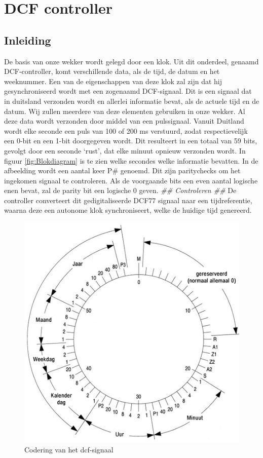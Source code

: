 \chapter{DCF controller}
\section{Inleiding}
De basis van onze wekker wordt gelegd door een klok. Uit dit onderdeel, genaamd DCF-controller,  komt verschillende data, als de tijd, de datum en het weeknummer. Een van de eigenschappen van deze klok zal zijn dat hij gesynchroniseerd wordt met een zogenaamd DCF-signaal. Dit is een signaal dat in duitsland verzonden wordt en allerlei informatie bevat, als de actuele tijd en de datum. Wij zullen meerdere van deze elementen gebruiken in onze wekker.  Al deze data wordt verzonden door middel van een pulssignaal. Vanuit Duitland wordt elke seconde een puls van 100 of 200 ms verstuurd, zodat respectievelijk een 0-bit en een 1-bit doorgegeven wordt. Dit resulteert in een totaal van 59 bits, gevolgt door een seconde ‘rust’, dat elke minuut opnieuw verzonden wordt. In figuur \ref{fig:Blokdiagram} is te zien welke secondes welke informatie bevatten. In de afbeelding wordt een aantal keer P\# genoemd. Dit zijn paritychecks om het ingekomen signaal te controleren. Als de voorgaande bits een even aantal logische enen bevat, zal de parity bit een logische 0 geven. \emph{\color{red} \#\# Controleren \#\#} De controller converteert dit gedigitaliseerde DCF77 signaal naar een tijdreferentie, waarna deze een autonome klok synchroniseert, welke de huidige tijd genereerd.

\begin{figure}[h!]
\center
\includegraphics[scale=2]{Figuren/DCF77/dcf77coding.png}
\caption{Codering van het dcf-signaal}
\label{fig:dcfsignaal}
\end{figure}

